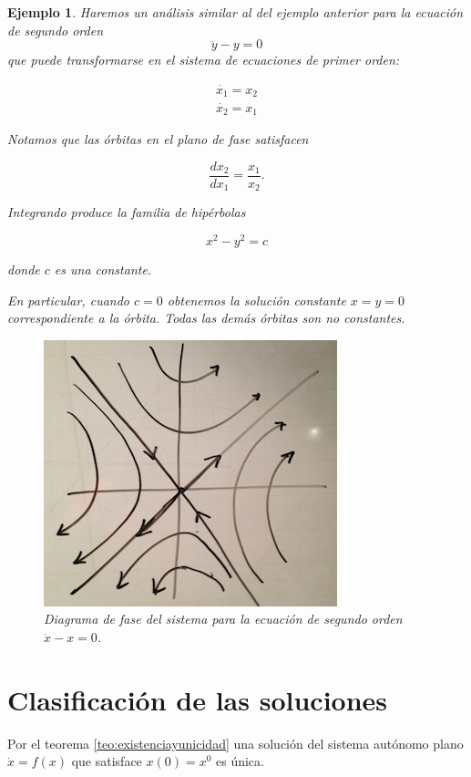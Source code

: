 \documentclass[11pt]{book}
\theoremstyle{definition}
\numberwithin{definition}{section}
\theoremstyle{theorem}
\numberwithin{theorem}{section}
\numberwithin{lemma}{section}
\numberwithin{corollary}{section}
\theoremstyle{plain}
\newtheorem{example}{Ejemplo}
\numberwithin{example}{section}
\begin{document}
\begin{example}
Haremos un análisis similar al del ejemplo anterior para la ecuación de segundo orden $$ \ddot{y} - y = 0$$ que puede transformarse en el sistema de ecuaciones de primer orden:

$$
\begin{array}{l}
	\dot{x_1} = x_2 \\
	\dot{x_2} = x_1
\end{array}
$$

Notamos que las órbitas en el plano de fase satisfacen

$$ \dfrac{dx_2}{dx_1} = \frac{x_1}{x_2}. $$

Integrando produce la familia de hipérbolas

$$ x^2 - y^2 = c $$

donde $c$ es una constante.

En particular, cuando $c = 0$ obtenemos la solución constante $x = y = 0$ correspondiente a la órbita. Todas las demás órbitas son no constantes.

\begin{figure}[!ht] \centering
	\includegraphics[scale=0.5]{figures/linearsystem-hyperbolas.jpg}
	\caption{Diagrama de fase del sistema para la ecuación de segundo orden $\ddot{x} - x = 0$.}
\end{figure}

\end{example}

\section{Clasificación de las soluciones}

Por el teorema \ref{teo:existenciayunicidad} una solución del sistema autónomo plano $\dot{x} = f(x)$ que satisface $x(0) = x^0$ es única. 
\end{document}
